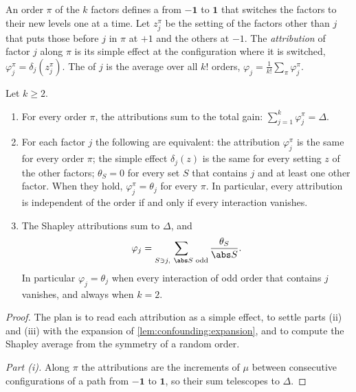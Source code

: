 \begin{refsection}
\begin{definition}\label{def:confounding:attribution}
An order $\pi$ of the $k$ factors defines a  from $-\mathbf 1$ to $\mathbf 1$ that switches the factors to their new levels one at a time. Let $z^\pi_j$ be the setting of the factors other than $j$ that puts those before $j$ in $\pi$ at $+1$ and the others at $-1$. The \emph{attribution} of factor $j$ along $\pi$ is its simple effect at the configuration where it is switched, $\varphi^\pi_j=\delta_j(z^\pi_j)$. The  of $j$ is the average over all $k!$ orders, $\varphi_j=\frac1{k!}\sum_\pi\varphi^\pi_j$.
\end{definition}

\begin{theorem}\label{thm:confounding:paths}
Let $k\ge2$.
\begin{enumerate}
\item For every order $\pi$, the attributions sum to the total gain: $\sum_{j=1}^k\varphi^\pi_j=\Delta$.
\item For each factor $j$ the following are equivalent: the attribution $\varphi^\pi_j$ is the same for every order $\pi$; the simple effect $\delta_j(z)$ is the same for every setting $z$ of the other factors; $\theta_S=0$ for every set $S$ that contains $j$ and at least one other factor. When they hold, $\varphi^\pi_j=\theta_j$ for every $\pi$. In particular, every attribution is independent of the order if and only if every interaction vanishes.
\item The Shapley attributions sum to $\Delta$, and
\begin{equation}\label{eq:confounding:shapley}
\varphi_j=\sum_{S\ni j,\ \abs S\text{ odd}}\frac{\theta_S}{\abs S}.
\end{equation}
In particular $\varphi_j=\theta_j$ when every interaction of odd order that contains $j$ vanishes, and always when $k=2$.
\end{enumerate}
\end{theorem}

\begin{proof}
The plan is to read each attribution as a simple effect, to settle parts (ii) and (iii) with the expansion of \cref{lem:confounding:expansion}, and to compute the Shapley average from the symmetry of a random order.

\emph{Part (i).} Along $\pi$ the attributions are the increments of $\mu$ between consecutive configurations of a path from $-\mathbf 1$ to $\mathbf 1$, so their sum telescopes to $\Delta$.


\end{proof}
\end{refsection}
